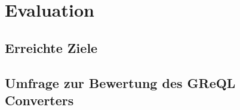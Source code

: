 \chapter{Evaluation}
\section{Erreichte Ziele}
\section{Umfrage zur Bewertung des GReQL Converters}
